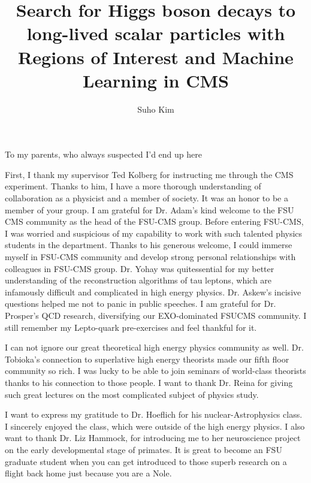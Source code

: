 \documentclass[11pt,expanded,copyright]{fsuthesis}
\title{Search for Higgs boson decays to long-lived scalar particles with Regions of Interest and Machine Learning in CMS}
\author{Suho Kim}  %
\begin{document}
\frontmatter          %
\maketitle            %
\makecommitteepage    %

\begin{dedication}
\centering
To my parents, who always suspected I'd end up here
\end{dedication}

\begin{acknowledgments}
First, I thank my supervisor Ted Kolberg for instructing me through the CMS experiment. Thanks to him, I have a more thorough understanding of collaboration as a physicist and a member
of society. 
It was an honor to be a member of your group. 
I am grateful for Dr. Adam’s kind welcome to the FSU
CMS community as the head of the FSU-CMS group. Before entering FSU-CMS, I was worried and
suspicious of my capability to work with such talented physics students in the department. 
Thanks to his generous welcome, I could immerse myself in FSU-CMS community and develop strong personal relationships with colleagues in FSU-CMS group. Dr. Yohay
was quitessential for my better understanding of the reconstruction algorithms of tau leptons, which
are infamously difficult and complicated in high energy physics. Dr. Askew’s incisive questions
helped me not to panic in public speeches. I am grateful for Dr. Prosper’s QCD research, diversifying our EXO-dominated FSUCMS community. I still remember my Lepto-quark pre-exercises
and feel thankful for it.

I can not ignore our great theoretical high energy physics community as well. Dr. Tobioka’s
connection to superlative high energy theorists made our fifth floor community so rich. I was lucky
to be able to join seminars of world-class theorists thanks to his connection to those people. I want
to thank Dr. Reina for giving such great lectures on the most complicated subject of physics
study.

I want to express my gratitude to Dr. Hoeflich for his nuclear-Astrophysics class. I sincerely
enjoyed the class, which were outside of the high energy physics. I also want to thank Dr. Liz
Hammock, for introducing me to her neuroscience project on the early developmental stage of primates.
It is great to become an FSU graduate student when you can get introduced to those superb
research on a flight back home just because you are a Nole.


\end{acknowledgments}
\end{document}
